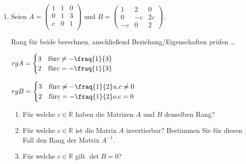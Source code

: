 \documentclass[12pt,a4paper]{scrreprt}
\newcommand{\R}{\mathds{R}}
\newcommand{\Lsg}{\textbf{Lsg.:}}
\begin{document}
\begin{enumerate}
	\item Seien $A=\begin{pmatrix}
 1 & 1 & 0 \\
 0 & 1 & 3 \\
 c & 0 & 1 \\ \end{pmatrix}$
 und $B=\begin{pmatrix}
 1 & 2 & 0 \\
 0 & -c & 2c \\
-c & 0 & 2 \end{pmatrix}.$ 

Rang für beide berechnen, anschließend Beziehung/Eigenschaften prüfen \ldots

$
rg A = \begin{cases}
	3 & \text{für} c \neq - \fraq{1}{3} \\
	2 & \text{für} c=-\fraq{1}{3}
\end{cases} \\
$

$
rg B = \begin{cases}
	3 & \text{für} c \neq - \fraq{1}{2} u. c \neq 0 \\
	2 & \text{für}  c=-\fraq{1}{2} o. c=0
\end{cases}
$

	\begin{enumerate}
		\item Für welche $c \in \R$ haben die Matrizen $A$ und $B$ denselben Rang?
		\item Für welche $c \in \R$ ist die Matrix $A$ invertierbar? Bestimmen Sie für diesen Fall den Rang der Matrix $A^{-1}$.
		\item Für welche $c \in \R$ gilt $\det B=0$?
	\end{enumerate}

\end{enumerate}
\end{document}
